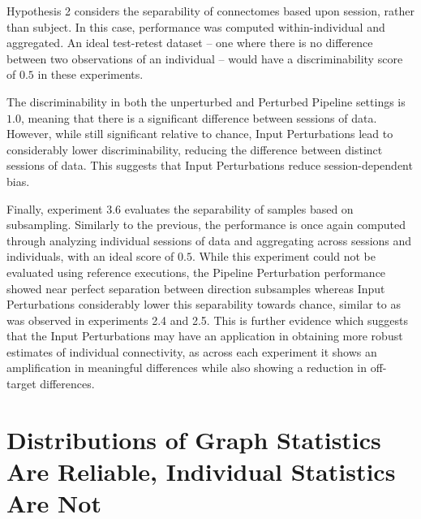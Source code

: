 \documentclass[fleqn,10pt]{SelfArx} %
\begin{document}
Hypothesis 2 considers the separability of connectomes based upon session, rather than subject. In this case,
performance was computed within-individual and aggregated. An ideal test-retest dataset – one where there is no
difference between two observations of an individual – would have a discriminability score of $0.5$ in these
experiments.

The discriminability in both the unperturbed and Perturbed Pipeline settings is $1.0$, meaning that there is a
significant difference between sessions of data. However, while still significant relative to chance, Input
Perturbations lead to considerably lower discriminability, reducing the difference between distinct sessions of data.
This suggests that Input Perturbations reduce session-dependent bias.

Finally, experiment 3.6 evaluates the separability of samples based on subsampling. Similarly to the previous, the
performance is once again computed through analyzing individual sessions of data and aggregating across sessions and
individuals, with an ideal score of $0.5$. While this experiment could not be evaluated using reference executions, the
Pipeline Perturbation performance showed near perfect separation between direction subsamples whereas Input
Perturbations considerably lower this separability towards chance, similar to as was observed in experiments 2.4 and
2.5. This is further evidence which suggests that the Input Perturbations may have an application in obtaining more
robust estimates of individual connectivity, as across each experiment it shows an amplification in meaningful
differences while also showing a reduction in off-target differences.

\section*{Distributions of Graph Statistics Are Reliable, Individual Statistics Are Not}
\end{document}
